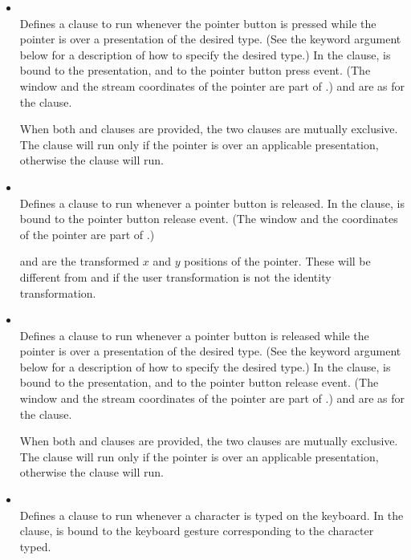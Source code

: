 \begin{itemize}
\item { } \\
Defines a clause to run whenever the pointer button is pressed while the pointer
is over a presentation of the desired type. (See the keyword argument
 below for a description of how to specify the desired type.)
In the clause,  is bound to the presentation, and 
to the pointer button press event.  (The window and the stream coordinates of
the pointer are part of .)   and  are as for the
 clause.

When both  and  clauses
are provided, the two clauses are mutually exclusive.  The
 clause will run only if the pointer is over an
applicable presentation, otherwise the  clause will
run.

\item { } \\
Defines a clause to run whenever a pointer button is released. In the clause,
 is bound to the pointer button release event. (The window and the
coordinates of the pointer are part of .)

 and  are the transformed $x$ and $y$ positions of the pointer.
These will be different from  and  if
the user transformation is not the identity transformation.

\item { } \\
Defines a clause to run whenever a pointer button is released while the pointer
is over a presentation of the desired type. (See the keyword argument
 below for a description of how to specify the desired type.)
In the clause,  is bound to the presentation, and 
to the pointer button release event.  (The window and the stream coordinates of
the pointer are part of .)   and  are as for the
 clause.

When both  and 
clauses are provided, the two clauses are mutually exclusive.  The
 clause will run only if the pointer is over an
applicable presentation, otherwise the  clause will
run.

\item { } \\
Defines a clause to run whenever a character is typed on the keyboard.  In the
clause,  is bound to the keyboard gesture corresponding to the
character typed.
\end{itemize}


